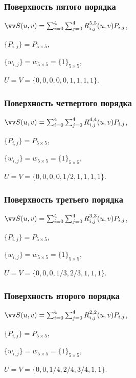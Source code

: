 \documentclass[10pt]{beamer}
\begin{document}
\begin{frame}\frametitle{Поверхность пятого порядка}
	
	
	
	{
	}{
		$\VV S(u,v)=\sum_{i=0}^4\sum_{j=0}^4R_{i,j}^{5,5}(u,v)P_{i,j}$,
		
		$\{P_{i,j}\}=P_{5\times5}$,
		
		$\{w_{i,j}\}=w_{5\times5}=\{1\}_{5\times5}$,
		
		$U=V=\{0,0,0,0,0,1,1,1,1\}$.
	}
	
\end{frame}

\begin{frame}\frametitle{Поверхность четвертого порядка}
	
	
	
	{
	}{
		$\VV S(u,v)=\sum_{i=0}^4\sum_{j=0}^4R_{i,j}^{4,4}(u,v)P_{i,j}$,
		
		$\{P_{i,j}\}=P_{5\times5}$,
		
		$\{w_{i,j}\}=w_{5\times5}=\{1\}_{5\times5}$,
		
		$U=V=\{0,0,0,0,1/2,1,1,1,1\}$.
	}
	
\end{frame}

\begin{frame}\frametitle{Поверхность третьего порядка}
	
	
	
	{
	}{
		$\VV S(u,v)=\sum_{i=0}^4\sum_{j=0}^4R_{i,j}^{3,3}(u,v)P_{i,j}$,
		
		$\{P_{i,j}\}=P_{5\times5}$,
		
		$\{w_{i,j}\}=w_{5\times5}=\{1\}_{5\times5}$,
		
		$U=V=\{0,0,0,1/3,2/3,1,1,1\}$.
	}
	
\end{frame} 

\begin{frame}\frametitle{Поверхность второго порядка}
	
	
	
	{
	}{
		$\VV S(u,v)=\sum_{i=0}^4\sum_{j=0}^4R_{i,j}^{2,2}(u,v)P_{i,j}$,
		
		$\{P_{i,j}\}=P_{5\times5}$,
		
		$\{w_{i,j}\}=w_{5\times5}=\{1\}_{5\times5}$,
		
		$U=V=\{0,0,1/4,2/4,3/4,1,1\}$.
	}
	
\end{frame} 
\end{document}
